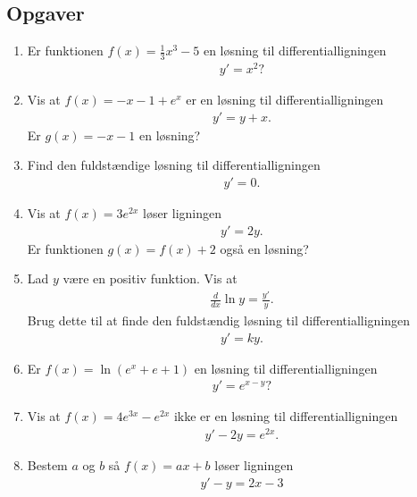 \subsection{Opgaver}

\begin{enumerate}
	\item Er funktionen $ f(x)=\frac{1}{3}x^3-5 $ en løsning til differentialligningen
	\begin{align*}
	y'=x^2?
	\end{align*}
	\item Vis at $f(x)=-x-1+e^x$ er en løsning til differentialligningen
	\begin{align*}
	y'=y+x.
	\end{align*}
	Er $g(x)=-x-1$ en løsning?
	\item Find den fuldstændige løsning til differentialligningen
	\begin{align*}
	y'=0.
	\end{align*}
	
	\item Vis at $f(x)=3e^{2x}$ løser ligningen
	\begin{align*}
	y'=2y.
	\end{align*}
	Er funktionen $g(x)=f(x)+2$ også en løsning?
	
	
	\item \label{it:diffeq11} Lad $y$ være en positiv funktion. Vis at
	\begin{align*}
	\frac{d}{dx} \ln y= \frac{y'}{y}.
	\end{align*}
	Brug dette til at finde den fuldstændig løsning til differentialligningen
	\begin{align*}
	y'=ky.
	\end{align*}
	
	
	\item Er $f(x)=\ln(e^x+e+1)$ en løsning til differentialligningen
	\begin{align*}
	y'=e^{x-y}?
	\end{align*}
	
	\item Vis at $f(x)=4e^{3x}-e^{2x}$ ikke er en løsning til differentialligningen
	\begin{align*}
	y'-2y=e^{2x}.
	\end{align*}
	
	\item Bestem $a$ og $b$ så $f(x)=ax+b$ løser ligningen
	\begin{align*}
	y'-y=2x-3
	\end{align*}
	

\end{enumerate}
